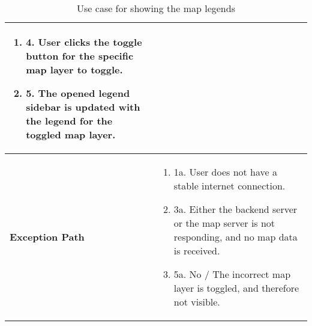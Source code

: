 \begin{table}[h]
\begin{tabularx}{\textwidth}{|l|X|}
\begin{enumerate}[label=,left=0pt]
            \item 4. User clicks the toggle button for the specific map layer to toggle.
            \item 5. The opened legend sidebar is updated with the legend for the toggled map layer.
        \end{enumerate} \\
        \hline
        \textbf{Exception Path} & 
        \begin{enumerate}[label=,left=0pt]
            \item 1a. User does not have a stable internet connection.
            \item 3a. Either the backend server or the map server is not responding, and no map data is received.
            \item 5a. No / The incorrect map layer is toggled, and therefore not visible.
        \end{enumerate} \\
        \hline
    \end{tabularx}
    \caption*{Use case for showing the map legends}
    \label{tab:use_case_show_legend_appendix}
\end{table}

